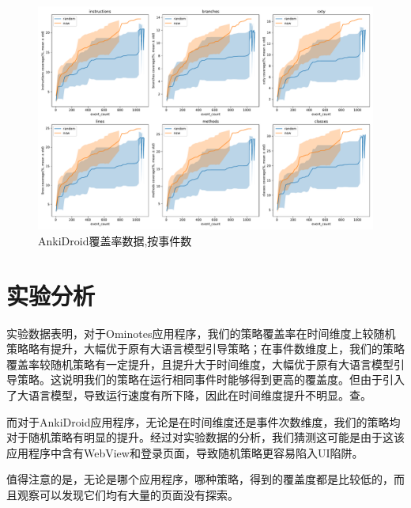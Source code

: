 \documentclass{article}
\begin{document}
\begin{figure}[H]
\centering
\includegraphics[width=\textwidth]{res/com.ichi2.anki.debug/coverage_event.pdf}
\caption{AnkiDroid覆盖率数据,按事件数}
\end{figure}

\section{实验分析}

实验数据表明，对于Ominotes应用程序，我们的策略覆盖率在时间维度上较随机策略略有提升，大幅优于原有大语言模型引导策略；在事件数维度上，我们的策略覆盖率较随机策略有一定提升，且提升大于时间维度，大幅优于原有大语言模型引导策略。这说明我们的策略在运行相同事件时能够得到更高的覆盖度。但由于引入了大语言模型，导致运行速度有所下降，因此在时间维度提升不明显。查。

而对于AnkiDroid应用程序，无论是在时间维度还是事件次数维度，我们的策略均对于随机策略有明显的提升。经过对实验数据的分析，我们猜测这可能是由于这该应用程序中含有WebView和登录页面，导致随机策略更容易陷入UI陷阱。

值得注意的是，无论是哪个应用程序，哪种策略，得到的覆盖度都是比较低的，而且观察可以发现它们均有大量的页面没有探索。
\end{document}
